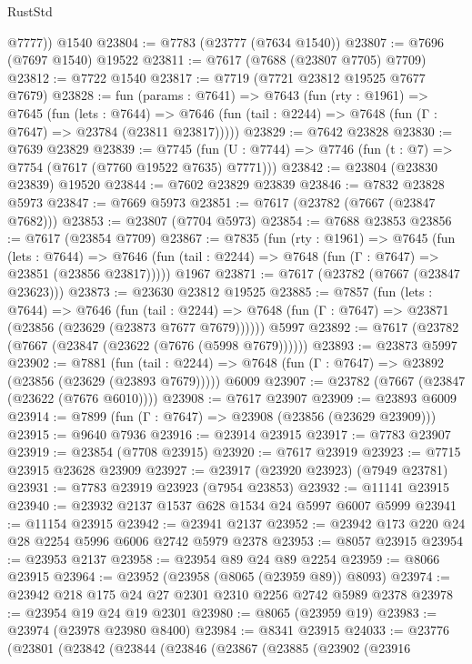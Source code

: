 \begin{lexlean}{RustStd}
\begin{coremodule}
        @7777))
    @1540
@23804 := @7783 (@23777 (@7634 @1540))
@23807 := @7696 (@7697 @1540) @19522
@23811 := @7617 (@7688 (@23807 @7705) @7709)
@23812 := @7722 @1540
@23817 := @7719 (@7721 @23812 @19525 @7677 @7679)
@23828 := fun (params : @7641) =>
  @7643
    (fun (rty : @1961) =>
    @7645
      (fun (lets : @7644) =>
      @7646 (fun (tail : @2244) => @7648 (fun (Γ : @7647) => @23784 (@23811 @23817)))))
@23829 := @7642 @23828
@23830 := @7639 @23829
@23839 := @7745
    (fun (U : @7744) => @7746 (fun (t : @7) => @7754 (@7617 (@7760 @19522 @7635) @7771)))
@23842 := @23804 (@23830 @23839) @19520
@23844 := @7602 @23829 @23839
@23846 := @7832 @23828 @5973
@23847 := @7669 @5973
@23851 := @7617 (@23782 (@7667 (@23847 @7682)))
@23853 := @23807 (@7704 @5973)
@23854 := @7688 @23853
@23856 := @7617 (@23854 @7709)
@23867 := @7835
    (fun (rty : @1961) =>
    @7645
      (fun (lets : @7644) =>
      @7646 (fun (tail : @2244) => @7648 (fun (Γ : @7647) => @23851 (@23856 @23817)))))
    @1967
@23871 := @7617 (@23782 (@7667 (@23847 @23623)))
@23873 := @23630 @23812 @19525
@23885 := @7857
    (fun (lets : @7644) =>
    @7646
      (fun (tail : @2244) =>
      @7648 (fun (Γ : @7647) => @23871 (@23856 (@23629 (@23873 @7677 @7679))))))
    @5997
@23892 := @7617 (@23782 (@7667 (@23847 (@23622 (@7676 (@5998 @7679))))))
@23893 := @23873 @5997
@23902 := @7881
    (fun (tail : @2244) => @7648 (fun (Γ : @7647) => @23892 (@23856 (@23629 (@23893 @7679)))))
    @6009
@23907 := @23782 (@7667 (@23847 (@23622 (@7676 @6010))))
@23908 := @7617 @23907
@23909 := @23893 @6009
@23914 := @7899 (fun (Γ : @7647) => @23908 (@23856 (@23629 @23909)))
@23915 := @9640 @7936
@23916 := @23914 @23915
@23917 := @7783 @23907
@23919 := @23854 (@7708 @23915)
@23920 := @7617 @23919
@23923 := @7715 @23915 @23628 @23909
@23927 := @23917 (@23920 @23923) (@7949 @23781)
@23931 := @7783 @23919 @23923 (@7954 @23853)
@23932 := @11141 @23915
@23940 := @23932 @2137 @1537 @628 @1534 @24 @5997 @6007 @5999
@23941 := @11154 @23915
@23942 := @23941 @2137
@23952 := @23942 @173 @220 @24 @28 @2254 @5996 @6006 @2742 @5979 @2378
@23953 := @8057 @23915
@23954 := @23953 @2137
@23958 := @23954 @89 @24 @89 @2254
@23959 := @8066 @23915
@23964 := @23952 (@23958 (@8065 (@23959 @89)) @8093)
@23974 := @23942 @218 @175 @24 @27 @2301 @2310 @2256 @2742 @5989 @2378
@23978 := @23954 @19 @24 @19 @2301
@23980 := @8065 (@23959 @19)
@23983 := @23974 (@23978 @23980 @8400)
@23984 := @8341 @23915
@24033 := @23776
    (@23801
      (@23842
        (@23844
          (@23846
            (@23867
              (@23885
                (@23902
                  (@23916

\end{coremodule}
\end{lexlean}
